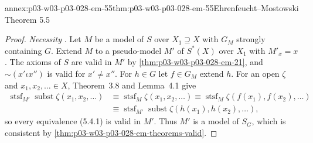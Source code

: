 \begin{annexitem}{annex:p03-w03-p03-028-em-55}{thm:p03-w03-p03-028-em-55}{Ehrenfeucht--Mostowski Theorem 5.5}
\begin{proof}
\emph{Necessity} \cite[p.~60]{EhrenfeuchtMostowski1956}.  Let \(M\) be a model
of \(S\) over \(X_1\supseteq X\) with \(G_M\) strongly containing \(G\).  Extend
\(M\) to a pseudo-model \(M'\) of \(S^*(X)\) over \(X_1\) with \(M'_x=x\).  The
axioms of \(S\) are valid in \(M'\) by \cref{thm:p03-w03-p03-028-em-21}, and
\(\mathord\sim(x'\iota x'')\) is valid for \(x'\neq x''\).  For \(h\in G\) let
\(f\in G_M\) extend \(h\).  For an open \(\zeta\) and \(x_1,x_2,\ldots\in X\),
Theorem~3.8 and Lemma~4.1 give
\begin{align*}
  \operatorname{stsf}_{M'}\operatorname{subst}\zeta(x_1,x_2,\ldots)
  &\equiv\operatorname{stsf}_M\zeta(x_1,x_2,\ldots)
  \equiv\operatorname{stsf}_M\zeta(f(x_1),f(x_2),\ldots)\\
  &\equiv\operatorname{stsf}_{M'}\operatorname{subst}\zeta(h(x_1),h(x_2),\ldots),
\end{align*}
so every equivalence (5.4.1) is valid in \(M'\).  Thus
\(M'\) is a model of \(S_G\), which is consistent by
\cref{thm:p03-w03-p03-028-em-theorems-valid}.
\end{proof}
\end{annexitem}

